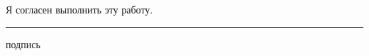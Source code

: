 \documentclass[14pt, a4paper]{article}
\begin{document}
 

\thispagestyle{empty}
\begin{center}

\Huge{  }

\vspace{8cm}

\Large{Я согласен выполнить эту работу.}

\vspace{3cm} 

\def\blob#1#2{\draw[dashed,rounded corners=#1*3mm] (#2) +($(0:#1*2+#1*rnd)$)
\foreach \a in {20,40,...,350} {  -- +($(\a: #1*2+#1*rnd)$) } -- cycle;}




\vfill
\rule{\linewidth}{0.4pt}
\large{подпись}

\end{center}
\end{document}
